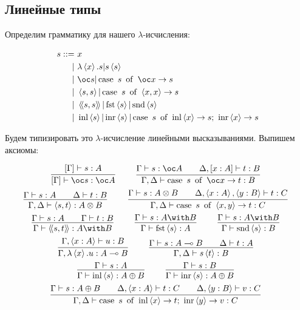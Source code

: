 \subsection{\texorpdfstring{Линейные типы}{Linear types}}

Определим грамматику для нашего $\lambda$-исчисления:
\begin{bnf}
\begin{alignat*}{2}
	s ::= &\ x \\
			  | &\ \lambda\pair{x}.s | s\pair{s} \\
			  | &\ \oc s | \caseb{s}{\oc x \rightarrow s} \\
			  | &\ \pair{s,s} | \caseb{s}{\pair{x,x} \rightarrow s} \\
			  | &\ \ppair{s,s} | \fst \pair{s} | \snd \pair{s} \\
			  | &\ \inl \pair{s} | \inr \pair{s}|
                    \casec{s}{\inl \pair{x} \rightarrow s}{\inr \pair{x} \rightarrow s}
\end{alignat*}
\end{bnf}
Будем типизировать это $\lambda$-исчисление линейными высказываниями. Выпишем аксиомы:
\begin{@empty}
\inferspacing
\begin{gather*}
	\infer[]
		{[\Gamma]\vdash \oc s : \oc A}
		{[\Gamma]\vdash s : A} \qquad
	\infer[]
		{\Gamma, \Delta\vdash \caseb{s}{\oc x \rightarrow t} : B}
		{\Gamma\vdash s : \oc A && \Delta, [x : A]\vdash t : B} \\
	\infer[]
		{\Gamma, \Delta\vdash \pair{s, t} : A \otimes B}
		{\Gamma \vdash s : A && \Delta\vdash t : B} \qquad
	\infer[]
		{\Gamma, \Delta \vdash \caseb{s}{\pair{x, y} \rightarrow t} : C}
		{\Gamma\vdash s : A \otimes B && \Delta, \pair{x : A}, \pair{y : B} \vdash t : C} \\
	\infer[]{\Gamma \vdash \ppair{s, t} : A \with B}{\Gamma \vdash s : A && \Gamma \vdash t : B} \qquad
	\infer[]{\Gamma \vdash \fst \pair{s} : A}{\Gamma \vdash s : A \with B} \qquad
	\infer[]{\Gamma \vdash \snd \pair{s} : B}{\Gamma \vdash s : A \with B} \\
	\infer[]{\Gamma, \lambda\pair{x}.u : A \multimap B}{\Gamma, \pair{x : A} \vdash u : B} \qquad
	\infer[]{\Gamma, \Delta \vdash  s \pair{t} : B}{\Gamma \vdash s : A \multimap B && \Delta \vdash t : A} \\
	\infer[]{\Gamma \vdash \inl \pair{s} : A \oplus B}{\Gamma \vdash s : A} \qquad
	\infer[]{\Gamma \vdash \inr \pair{s} : A \oplus B}{\Gamma \vdash s : B} \\
	\infer[]
		{\Gamma, \Delta \vdash \casec{s}{\inl \pair{x} \rightarrow t}{\inr \pair{y} \rightarrow v} : C}
		{\Gamma \vdash s : A \oplus B && \Delta, \pair{x : A} \vdash t : C && \Delta, \pair{y : B} \vdash v : C}
\end{gather*}
\end{@empty}
